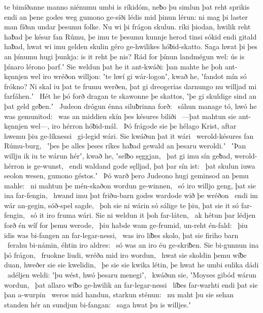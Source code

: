 te bimíðanne manno niénumu
umbi is ríkidóm, neƀo þu simlun þat reht sprikis
endi an þene godes weg gumono ge-síði
lédis mid þinun lérun: ni mag þi laster man
fíðan undar þesumu folke. Nu wi þi frágon skulun.
ríki þiodan, hwilik reht haƀad
þe késur fan Rúmu, þe imu te þesumu kunnje herod
tinsi sókid endi gitald haƀad,
hwat wi imu gelden skulin géro ge-hwilikes
hóƀid-skatto. Saga hwat þi þes an þínumu hugi þunkja:
is it reht þe nis? Rád for þínun
landmégun wel: ús is þínaro lérono þarf.ʼ
Sie weldun þat he it ant-kwáði: þan mahte he þoh ant-kęnnjen wel
iro wréðon willjon: ʽte hwí gi wár-logonʼ, kwað he,
ʽfandot mín só frókno? Ni skal iu þat te frumu werðen,
þat gi dreogerias darnungo nu
willjad mi farfáhen.ʼ \hld\ Hét he þó forð dragan
te skawonne þe skattos, ʽþe gi skuldige sind
an þat geld geƀen.ʼ \hld\ Judeon drógun
énna siluƀrinna forð: \hld\ sáhun manage tó,
hwó he was gemunitod: \hld\ was an middien skín
þes késures biliði \hld\ —þat mahtun sie ant-kęnnjen wel—,
iro hérron hóƀid-mál. \hld\ Þó frágode sie þe hélago Krist,
aftar hwemu þiu ge-líknessi \hld\ gi-legid wári.
Sie kwáðun þat it wári \hld\ werold-késures
fan Rúmu-burg, \hld\ ʽþes þe alles þeses ríkes haƀad
gewald an þesaru weroldi.ʼ \hld\ ʽÞan willju ik iu te wárun hérʼ, kwað he,
ʽselƀo sęggjan, \hld\ þat gi imu sín geƀad,
werold-hérron is ge-wunst, \hld\ endi waldand gode
sęlljad, þat þar sín ist: \hld\ þat skulun iuwa seolon wesen,
gumono géstos.ʼ \hld\ Þó warð þero Judeono hugi
geminsod an þemu mahle: \hld\ ni mahtun þe mén-skaðon
wordun ge-winnen, \hld\ só iro willjo geng,
þat sie ina far-fengin, \hld\ hwand imu þat friðu-barn godes
wardode wið þe wréðon \hld\ endi im wár an-gegin,
sóð-spel sagde, \hld\ þoh sie ni wárin só sálige te þiu,
þat sie it só far-fengin, \hld\ só it iro fruma wári.
Sie ni weldun it þoh far-láten, \hld\ ak hétun þar lédjen forð
én wíf for þemu werode, \hld\ þiu habde wam ge-frumid,
un-reht én-fald: \hld\ þiu idis was bi-fangen
an far-legar-nessi, \hld\ was iro líƀes skolo,
þat sie firiho barn \hld\ ferahu bi-námin,
éhtin iro aldres: \hld\ só was an iro éu ge-skriƀen.
Sie bi-gunnun ina þó frágon, \hld\ fruokne liudi,
wréða mid iro wordun, \hld\ hwat sie skoldin þemu wíƀe duan,
hweðer sie sie kwelidin, \hld\ þe sie sie kwika létin,
þe hwat he umbi sulika dádi \hld\ adéljen weldi:
ʽþu wést, hwó þesaru menegiʼ, \hld\ kwáðun sie, ʽMoyses gibód
wárun wordun, \hld\ þat allaro wíƀo ge-hwilik
an far-legar-nessi \hld\ líƀes far-warhti
endi þat sie þan a-wurpin \hld\ weros mid handun,
starkun sténun: \hld\ nu maht þu sie sehan standen hér
an sundjun bi-fangan: \hld\ saga hwat þu is willjes.ʼ
